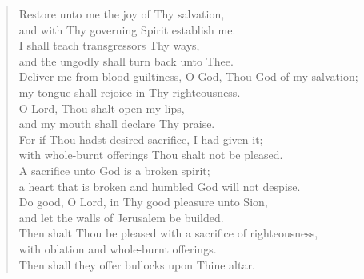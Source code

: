 {\begin{verse}
				Restore unto me the joy of Thy salvation,\nolinebreak\\
				and with Thy governing Spirit establish me.\nolinebreak\\
				I shall teach transgressors Thy ways,\nolinebreak\\
				and the ungodly shall turn back unto Thee.\nolinebreak\\
				Deliver me from blood-guiltiness, O God, Thou God of my salvation;\nolinebreak\\
				my tongue shall rejoice in Thy righteousness.\nolinebreak\\
				O Lord, Thou shalt open my lips,\nolinebreak\\
				and my mouth shall declare Thy praise.\nolinebreak\\
				For if Thou hadst desired sacrifice, I had given it;\nolinebreak\\
				with whole-burnt offerings Thou shalt not be pleased.\nolinebreak\\
				A sacrifice unto God is a broken spirit;\nolinebreak\\
				a heart that is broken and humbled God will not despise.\nolinebreak\\
				Do good, O Lord, in Thy good pleasure unto Sion,\nolinebreak\\
				and let the walls of Jerusalem be builded.\nolinebreak\\
				Then shalt Thou be pleased with a sacrifice of righteousness,\nolinebreak\\
				with oblation and whole-burnt offerings.\nolinebreak\\
				Then shall they offer bullocks upon Thine altar.
			\end{verse}
}
